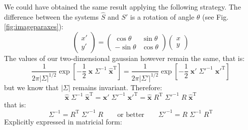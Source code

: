 We could have obtained the same result applying the following
strategy. The difference between the systems $\hat{S}$ and $S'$ is a
rotation of angle $\theta$ (see Fig.\ref{fig:imageparaxes}):
%
\begin{equation}
  \label{eq:rot}
  \begin{pmatrix}
    x' \\ y'
  \end{pmatrix} =
  \begin{pmatrix}
    \cos\theta & \sin\theta \\ -\sin\theta & \cos\theta
  \end{pmatrix}
  \begin{pmatrix}
    x \\ y
  \end{pmatrix}
\end{equation}
%
The values of our two-dimensional gaussian however remain the same,
that is:
%
\begin{equation}
  \label{eq:equalz}
  \frac{1}{2\pi|\Sigma|^{1/2}} 
  \exp\left[ -\frac{1}{2} \;
    \hat{\mathbf{x}} \; \Sigma^{-1} \; \hat{\mathbf{x}}^{\mathrm{T}}
  \right]
  =
  \frac{1}{2\pi|\Sigma'|^{1/2}} 
  \exp\left[ -\frac{1}{2} \;
    {\mathbf{x}'} \; {\Sigma'}^{-1} \; {\mathbf{x}'}^{\mathrm{T}}
  \right]  
\end{equation}
%
but we know that $|\Sigma|$ remains invariant. Therefore:
%
\begin{equation}
  \label{eq:equalzvec}
  \hat{\mathbf{x}} \; \Sigma^{-1} \; \hat{\mathbf{x}}^{\mathrm{T}} =
  {\mathbf{x}'} \; {\Sigma'}^{-1} \; {\mathbf{x}'}^{\mathrm{T}} =
  \hat{\mathbf{x}} \; R^{\mathrm{T}} \; 
  {\Sigma'}^{-1} \; R \; \hat{\mathbf{x}}^{\mathrm{T}}
\end{equation}
%
that is:
%
\begin{equation}
  \label{eq:equalmat}
  \Sigma^{-1} = R^{\mathrm{T}} \; {\Sigma'}^{-1} \; R 
  \qquad \text{or better} \qquad
  {\Sigma'}^{-1} = R \; \Sigma^{-1} \; R^{\mathrm{T}} 
\end{equation}
%
Explicitly expressed in matricial form:
%
